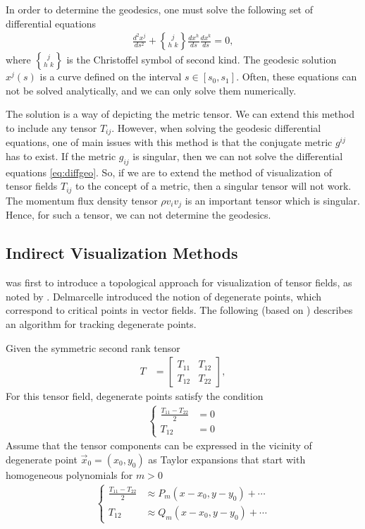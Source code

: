 \documentclass[main.tex]{subfiles}
\begin{document}
In order to determine the geodesics, one must solve the following set of differential 
equations
\begin{align}
\label{eq:diffgeo}
\frac{d^2 x^j}{ds^2} + {j\brace h\,\,k}\frac{dx^h}{ds}\frac{dx^k}{ds} = 0,
\end{align}
where ${j\brace h\,\,k}$ is the Christoffel symbol of second kind. The geodesic 
solution $x^j(s)$ is a curve defined on the interval $s\in[s_0,s_1]$. 
Often, these equations can not be solved analytically, and we can only solve them 
numerically. 

The solution is a way of depicting the metric tensor. We can extend this method to include
any tensor $T_{ij}$. However, when solving the geodesic differential equations, one of main issues with 
this method is that
the conjugate metric $g^{ij}$ has to exist. If the metric $g_{ij}$ is singular, then we can 
not solve the differential equations \eqref{eq:diffgeo}. So, if we are to extend the method of visualization
of tensor fields $T_{ij}$ to the concept of a metric, then a singular tensor will not work. 
The momentum flux density tensor $\rho v_i v_j$ is an important tensor which is singular. Hence,
for such a tensor, we can not determine the geodesics.

\subsection{Indirect Visualization Methods}

\cite{Del94} was first to introduce a topological approach for visualization of tensor fields,
as noted by \cite{Tri02}. Delmarcelle introduced the notion of degenerate points, which correspond 
to critical points in vector fields. The following (based on \cite{Del94}) describes an algorithm for 
tracking degenerate points.

Given the symmetric second rank tensor
\begin{align*} 
T&=
\begin{bmatrix}
    T_{11} &  T_{12} \\
    T_{12}  &  T_{22}
\end{bmatrix},
\end{align*}
For this tensor field, degenerate points satisfy the condition
\begin{align} 
\label{degenerate_cond}
\left\{\begin{matrix}
 \frac{T_{11} - T_{22}}{2} &=0 \\
 T_{12} &=0
\end{matrix}\right.
\end{align}
Assume that the tensor components can be expressed in the vicinity of degenerate point 
$\vec{x}_0 = (x_0,y_0)$ as Taylor expansions that start with homogeneous polynomials 
for $m > 0$
\begin{align*}
\left\{\begin{matrix}
 \frac{T_{11} - T_{22}}{2} &\approx P_m(x - x_0, y - y_0) + \cdots \\
 T_{12} &\approx Q_m(x - x_0, y - y_0) + \cdots
\end{matrix}\right.
\end{align*}
\end{document}
